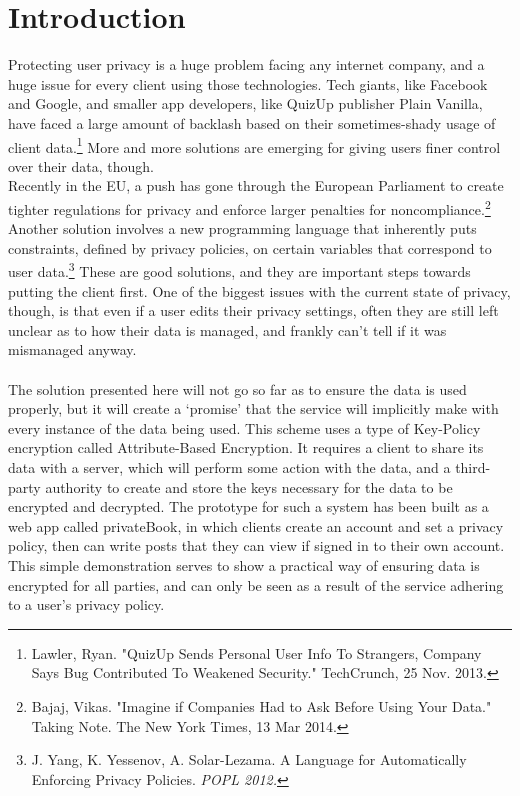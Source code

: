 \documentclass[12pt]{article}
\begin{document}
\section{Introduction}
Protecting user privacy is a huge problem facing any internet company, and a huge issue for every client using those technologies. Tech giants, like Facebook and Google, and smaller app developers, like QuizUp publisher Plain Vanilla, have faced a large amount of backlash based on their sometimes-shady usage of client data.\footnote{Lawler, Ryan. "QuizUp Sends Personal User Info To Strangers, Company Says Bug Contributed To Weakened Security." TechCrunch, 25 Nov. 2013.} More and more solutions are emerging for giving users finer control over their data, though. \\
Recently in the EU, a push has gone through the European Parliament to create tighter regulations for privacy and enforce larger penalties for noncompliance.\footnote{Bajaj, Vikas. "Imagine if Companies Had to Ask Before Using Your Data." Taking Note. The New York Times, 13 Mar 2014.} Another solution involves a new programming language that inherently puts constraints, defined by privacy policies, on certain variables that correspond to user data.\footnote{J. Yang, K. Yessenov, A. Solar-Lezama. A Language for Automatically Enforcing Privacy Policies. \it{POPL 2012.}} These are good solutions, and they are important steps towards putting the client first. One of the biggest issues with the current state of privacy, though, is that even if a user edits their privacy settings, often they are still left unclear as to how their data is managed, and frankly can't tell if it was mismanaged anyway. \\\\
The solution presented here will not go so far as to ensure the data is used properly, but it will create a `promise' that the service will implicitly make with every instance of the data being used. This scheme uses a type of Key-Policy encryption called Attribute-Based Encryption. It requires a client to share its data with a server, which will perform some action with the data, and a third-party authority to create and store the keys necessary for the data to be encrypted and decrypted. The prototype for such a system has been built as a web app called privateBook, in which clients create an account and set a privacy policy, then can write posts that they can view if signed in to their own account. This simple demonstration serves to show a practical way of ensuring data is encrypted for all parties, and can only be seen as a result of the service adhering to a user's privacy policy.
\end{document}
